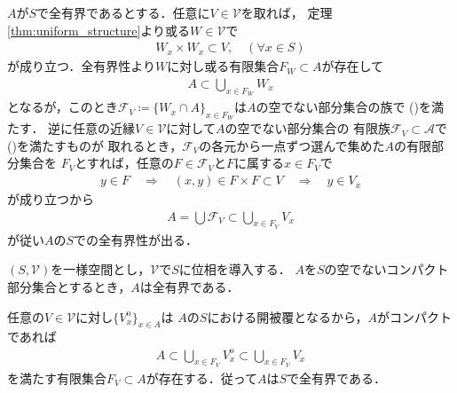 	\begin{prf}
		$A$が$S$で全有界であるとする．任意に$V \in \mathscr{V}$を取れば，
		定理\ref{thm:uniform_structure}より或る$W \in \mathscr{V}$で
		\begin{align}
			W_x \times W_x \subset V,\quad (\forall x \in S)
		\end{align}
		が成り立つ．全有界性より$W$に対し或る有限集合$F_W \subset A$が存在して
		\begin{align}
			A \subset \bigcup_{x \in F_W} W_x
		\end{align}
		となるが，このとき$\mathscr{F}_V \coloneqq
		\{W_x \cap A\}_{x \in F_W}$は$A$の空でない部分集合の族で
		()を満たす．
		逆に任意の近縁$V \in \mathscr{V}$に対して$A$の空でない部分集合の
		有限族$\mathscr{F}_V \subset \mathscr{A}$で
		()を満たすものが
		取れるとき，$\mathscr{F}_V$の各元から一点ずつ選んで集めた$A$の有限部分集合を
		$F_V$とすれば，任意の$F \in \mathscr{F}_V$と$F$に属する$x \in F_V$で
		\begin{align}
			y \in F \quad \Longrightarrow \quad
			(x,y) \in F \times F \subset V \quad \Longrightarrow \quad
			y \in V_x
		\end{align}
		が成り立つから
		\begin{align}
			A = \bigcup \mathscr{F}_V \subset \bigcup_{x \in F_V} V_x
		\end{align}
		が従い$A$の$S$での全有界性が出る．
		\QED
	\end{prf}
	
	\begin{screen}
		\begin{thm}[全有界かつ可算な基本近縁系を持つ一様位相空間は可分かつ第二可算]
			
		\end{thm}
	\end{screen}
	
	\begin{screen}
		\begin{thm}[コンパクトなら全有界]\label{thm:compact_then_totally_bounded}
			$(S,\mathscr{V})$を一様空間とし，$\mathscr{V}$で$S$に位相を導入する．
			$A$を$S$の空でないコンパクト部分集合とするとき，$A$は全有界である．
		\end{thm}
	\end{screen}
	
	\begin{prf}
		任意の$V \in \mathscr{V}$に対し$\{V_x^{\mathrm{o}}\}_{x \in A}$は
		$A$の$S$における開被覆となるから，$A$がコンパクトであれば
		\begin{align}
			A \subset \bigcup_{x \in F_V} V_x^{\mathrm{o}} 
			\subset \bigcup_{x \in F_V} V_x
		\end{align}
		を満たす有限集合$F_V \subset A$が存在する．従って$A$は$S$で全有界である．
		\QED
	\end{prf}
	
